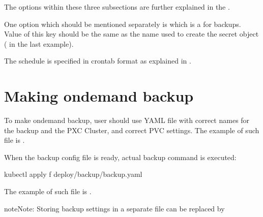 \documentclass[letterpaper,10pt,english]{sphinxmanual}
\begin{document}
\begin{sphinxVerbatim}[commandchars=\\\{\}]
 
\end{sphinxVerbatim}

The options within these three subsections are further explained in the
{\hyperref[\detokenize{operator:operator-backup-section}]{}}.

One option which should be mentioned separately is
 which is a 
for backups. Value of this key should be the same as the name used to
create the secret object ( in the last
example).

The schedule is specified in crontab format as explained in
{\hyperref[\detokenize{operator:operator-backup-section}]{}}.


\section{Making on\sphinxhyphen{}demand backup}
\label{\detokenize{backups:making-on-demand-backup}}
To make on\sphinxhyphen{}demand backup, user should use YAML file with correct names
for the backup and the PXC Cluster, and correct PVC settings. The
example of such file is
.

When the backup config file is ready, actual backup command is executed:

\begin{sphinxVerbatim}[commandchars=\\\{\}]
kubectl apply \PYGZhy{}f deploy/backup/backup.yaml
\end{sphinxVerbatim}

The example of such file is .

\begin{sphinxadmonition}{note}{Note:}
Storing backup settings in a separate file can be replaced by
\end{sphinxadmonition}
\end{document}
